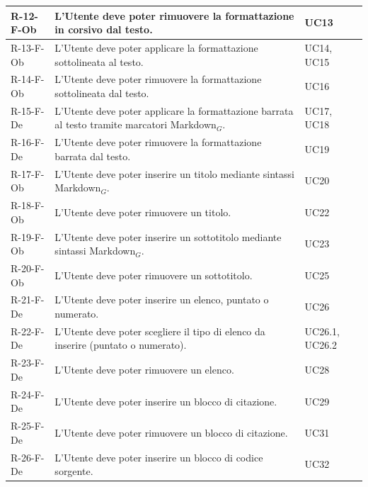 \documentclass[a4paper, 10pt]{article}
\begin{document}
\begin{longtable}{|p{2.2cm}|p{7.5cm}|p{4cm}|}
R-12-F-Ob & L'Utente deve poter rimuovere la formattazione in corsivo dal testo. & UC13 \\ \hline

R-13-F-Ob & L'Utente deve poter applicare la formattazione sottolineata al testo. & UC14, UC15 \\ \hline

R-14-F-Ob & L'Utente deve poter rimuovere la formattazione sottolineata dal testo. & UC16 \\ \hline

R-15-F-De & L'Utente deve poter applicare la formattazione barrata al testo tramite marcatori Markdown$_G$. & UC17, UC18 \\ \hline

R-16-F-De & L'Utente deve poter rimuovere la formattazione barrata dal testo. & UC19 \\ \hline

R-17-F-Ob & L'Utente deve poter inserire un titolo mediante sintassi Markdown$_G$. & UC20 \\ \hline

R-18-F-Ob & L'Utente deve poter rimuovere un titolo. & UC22 \\ \hline

R-19-F-Ob & L'Utente deve poter inserire un sottotitolo mediante sintassi Markdown$_G$. & UC23 \\ \hline

R-20-F-Ob & L'Utente deve poter rimuovere un sottotitolo. & UC25 \\ \hline

R-21-F-De & L'Utente deve poter inserire un elenco, puntato o numerato. & UC26 \\ \hline

R-22-F-De & L'Utente deve poter scegliere il tipo di elenco da inserire (puntato o numerato). & UC26.1, UC26.2 \\ \hline

R-23-F-De & L'Utente deve poter rimuovere un elenco. & UC28 \\ \hline

R-24-F-De & L'Utente deve poter inserire un blocco di citazione. & UC29 \\ \hline

R-25-F-De & L'Utente deve poter rimuovere un blocco di citazione. & UC31 \\ \hline

R-26-F-De & L'Utente deve poter inserire un blocco di codice sorgente. & UC32 \\ \hline


\end{longtable}
\end{document}
